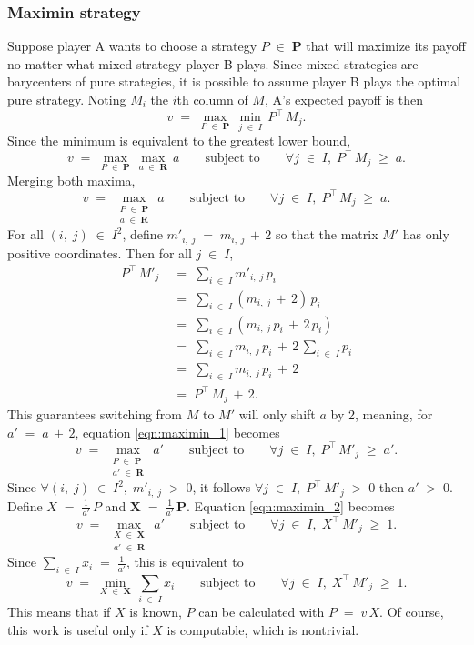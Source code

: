 \documentclass{report}
\theoremstyle{definition}
\theoremstyle{plain}
\begin{document}
\subsubsection{Maximin strategy}
Suppose player A wants to choose a strategy $P\;\in\;\mathbf P$ that will
maximize its payoff no matter what mixed strategy player B plays. Since mixed
strategies are barycenters of pure strategies, it is possible to assume player
B plays the optimal pure strategy. Noting $M_i$ the $i$th column of $M$, A's
expected payoff is then
\[v\;=\;\max_{P\;\in\;\mathbf P}\,\min_{j\;\in\;I}\,P^\top\,M_j.\]
Since the minimum is equivalent to the greatest lower bound,
\[
	v\;=\;\max_{P\;\in\;\mathbf P}\,\max_{a\;\in\;\mathbf R}\,a
		\qquad\text{subject to}\qquad
		\forall j\;\in\;I,\;P^\top\,M_j\;\geqslant\;a.
\]
Merging both maxima,
\begin{equation}
	v\;=\;\max_{\substack{P\;\in\;\mathbf P\\a\;\in\;\mathbf R}}\,a
		\qquad\text{subject to}\qquad
		\forall j\;\in\;I,\;P^\top\,M_j\;\geqslant\;a.
	\label{eqn:maximin_1}
\end{equation}
For all $\left(i,\;j\right)\;\in\;I^2$, define $m'_{i,\;j}\;=\;m_{i,\;j}\,+\,2$
so that the matrix $M'$ has only positive coordinates. Then for all $j\;\in\;I$,
\begin{align*}
	P^\top\,M'_j\;&=\;\sum_{i\;\in\;I}m'_{i,\;j}\,p_i \\
		&=\;\sum_{i\;\in\;I}\left(m_{i,\;j}\,+\,2\right)\,p_i \\
		&=\;\sum_{i\;\in\;I}\left(m_{i,\;j}\,p_i\,+\,2\,p_i\right) \\
		&=\;\sum_{i\;\in\;I}m_{i,\;j}\,p_i\,+\,2\,\sum_{i\;\in\;I}p_i \\
		&=\;\sum_{i\;\in\;I}m_{i,\;j}\,p_i\,+\,2 \\
		&=\;P^\top\,M_j\,+\,2.
\end{align*}
This guarantees switching from $M$ to $M'$ will only shift $a$ by 2, meaning,
for $a'\;=\;a\,+\,2$, equation \ref{eqn:maximin_1} becomes
\begin{equation}
	v\;=\;\max_{\substack{P\;\in\;\mathbf P\\a'\;\in\;\mathbf R}}\,a'
		\qquad\text{subject to}\qquad
		\forall j\;\in\;I,\;P^\top\,M'_j\;\geqslant\;a'.
	\label{eqn:maximin_2}
\end{equation}
Since $\forall\left(i,\;j\right)\;\in\;I^2,\;m'_{i,\;j}\;>\;0$, it follows
$\forall j\;\in\;I,\;P^\top\,M'_j\;>\;0$ then $a'\;>\;0$. Define
$X\;=\;\frac1{a'}\,P$ and $\mathbf X\;=\;\frac1{a'}\,\mathbf P$. Equation
\ref{eqn:maximin_2} becomes
\[
	v\;=\;\max_{\substack{X\;\in\;\mathbf X\\a'\;\in\;\mathbf R}}\,a'
		\qquad\text{subject to}\qquad
		\forall j\;\in\;I,\;X^\top\,M'_j\;\geqslant\;1.
\]
Since $\sum_{i\;\in\;I}x_i\;=\;\frac1{a'}$, this is equivalent to
\begin{equation}
	v\;=\;\min_{X\;\in\;\mathbf X}\,\sum_{i\;\in\;I}x_i
		\qquad\text{subject to}\qquad
		\forall j\;\in\;I,\;X^\top\,M'_j\;\geqslant\;1.
	\label{eqn:simplex_problem_maximin}
\end{equation}
This means that if $X$ is known, $P$ can be calculated with $P\;=\;v\,X$. Of
course, this work is useful only if $X$ is computable, which is nontrivial.
\end{document}
